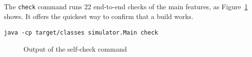 The \texttt{check} command runs 22 end-to-end checks of the main features, as Figure~\ref{fig:check} shows.
It offers the quickest way to confirm that a build works.

\begin{lstlisting}
java -cp target/classes simulator.Main check
\end{lstlisting}

\begin{figure}[H]
\centering
{}
\caption{Output of the self-check command}
\label{fig:check}
\end{figure}
